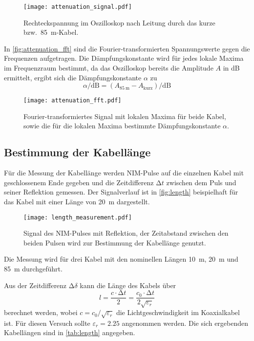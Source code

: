 \begin{figure}
  \centering
  \texttt{[image: attenuation\_signal.pdf]}
  \caption{%
    Rechteckspannung im Oszilloskop nach Leitung durch das kurze bzw.\ \SI{85}{\meter}-Kabel.%
  }\label{fig:attenuation_signal}
\end{figure}

In \autoref{fig:attenuation_fft} sind die Fourier-transformierten Spannungswerte gegen die Frequenzen aufgetragen.
Die Dämpfungskonstante wird für jedes lokale Maxima im Frequenzraum bestimmt,
da das Oszilloskop bereits die Amplitude $A$ in \si{\deci\bel} ermittelt, ergibt sich die Dämpfungskonstante $α$ zu
\begin{equation}
  α / \si{\deci\bel} = (A_{\SI{85}{\meter}} - A_\text{kurz}) / \si{\deci\bel}
\end{equation}

\begin{figure}
  \centering
  \texttt{[image: attenuation\_fft.pdf]}
  \caption{%
    Fourier-transformiertes Signal mit lokalen Maxima für beide Kabel, sowie die für die lokalen Maxima bestimmte Dämpfungskonstante $α$.
  }\label{fig:attenuation_fft}
\end{figure}

\subsection{Bestimmung der Kabellänge}

Für die Messung der Kabellänge werden NIM-Pulse auf die einzelnen Kabel mit geschlossenem Ende gegeben und die Zeitdifferenz $\increment t$ zwischen dem Puls und seiner Reflektion gemessen. 
Der Signalverlauf ist in \autoref{fig:length} beispielhaft für das Kabel mit einer Länge von \SI{20}{\meter} dargestellt.

\begin{figure}
  \centering
  \texttt{[image: length\_measurement.pdf]}
  \caption{%
    Signal des NIM-Pulses mit Reflektion, der Zeitabstand zwischen den beiden Pulsen wird zur Bestimmung der Kabellänge genutzt.
  }\label{fig:length}
\end{figure}

Die Messung wird für drei Kabel mit den nominellen Längen \SI{10}{\meter}, \SI{20}{\meter} und \SI{85}{\meter} durchgeführt.

Aus der Zeitdifferenz $\increment \delta$ kann die Länge des Kabels über
\begin{equation}
  l = \frac{c \cdot \increment t }{2} = \frac{c_0 \cdot \increment t}{2 \sqrt{ε_r}}
\end{equation}
berechnet werden, wobei $c = c_0 / \sqrt{ε_r}$ die Lichtgeschwindigkeit im Koaxialkabel ist.
Für diesen Versuch sollte $ε_r = \num{2.25}$ angenommen werden.
Die sich ergebenden Kabellängen sind in \autoref{tab:length} angegeben.
\begin{table}
  \centering
  \caption{%
    Laufzeitunterschied $\increment t$ und
    Kabellänge $l$ für die drei untersuchten Kabel.
  }\label{tab:length}
  
\end{table}

